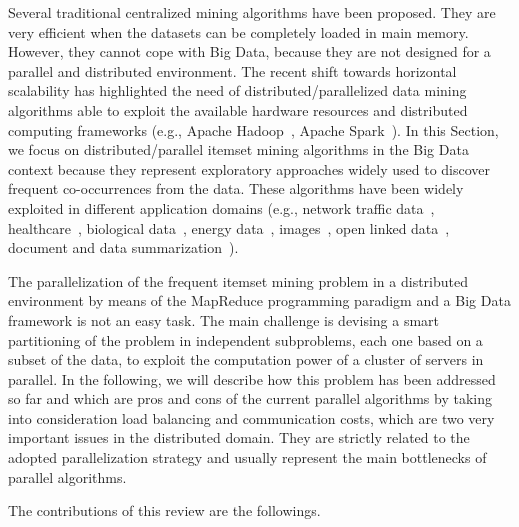 Several traditional centralized mining algorithms have been proposed. They are very efficient when the datasets can be completely loaded in 
main memory. However, they cannot cope with Big Data, because they are not designed for a parallel and distributed environment.  
The recent shift towards horizontal scalability has highlighted the need of
distributed/parallelized data mining algorithms able to exploit the available hardware resources and 
distributed computing frameworks (e.g., Apache Hadoop~\cite{HDFS}, Apache Spark~\cite{Zaharia_spark}).
In this Section, we focus on distributed/parallel itemset mining algorithms in the Big Data context because they
represent exploratory approaches widely used to discover frequent co-occurrences from the data. 
These algorithms have been widely exploited in different
application domains (e.g., network traffic data~\cite{ISPA13},
healthcare~\cite{META-TIST-2015}, biological data~\cite{DBLP:conf/sigmod/CongXPTY04}, energy
data~\cite{NostroENDM2016_senzacrossref}, images~\cite{zaianeimage},  open
linked data~\cite{BCOpenLinkedData}, document and data summarization~\cite{BaralisCFG15,DBLP:journals/cg/LopesPPM07,Mampaey:2011:TMI:2020408.2020499}).

The parallelization of the frequent itemset mining problem in a distributed environment by means of the MapReduce programming paradigm and a Big Data framework
is not an easy task. The main challenge is devising a smart partitioning of the problem in independent subproblems, each one based on a subset of the data, to exploit the computation power of a cluster of servers in parallel. In the following, we will describe how this problem has been addressed so far and which are pros and cons of the current parallel algorithms by taking into consideration load balancing and communication costs, which are two very important issues in the distributed domain. 
They are strictly related to the adopted parallelization strategy and usually represent the main bottlenecks of parallel algorithms.

The contributions of this review are the followings. 

